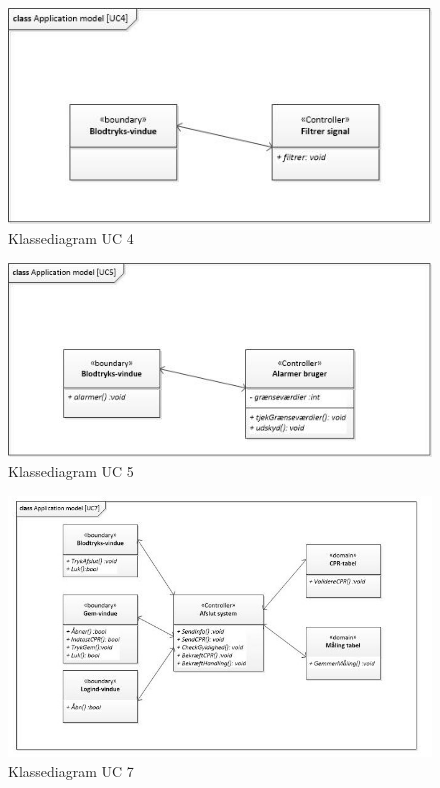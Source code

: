 \begin{figure}[H]
	\centering
	\includegraphics[width=1\textwidth]{Figurer/ISE/classAppModelUC4}
	\caption{Klassediagram UC 4}
	\label{classApp UC4}
\end{figure}

\begin{figure}[H]
	\centering
	\includegraphics[width=1\textwidth]{Figurer/ISE/classAppModelUC5}
	\caption{Klassediagram UC 5}
	\label{classApp UC5}
\end{figure}

\begin{figure}[H]
	\centering
	\includegraphics[width=1\textwidth]{Figurer/ISE/classAppModelUC7}
	\caption{Klassediagram UC 7}
	\label{classApp UC7}
\end{figure}

